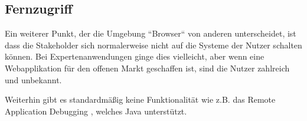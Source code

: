 \subsection{Fernzugriff}

Ein weiterer Punkt, der die Umgebung ``Browser`` von anderen unterscheidet, ist dass die Stakeholder sich normalerweise nicht auf die Systeme der Nutzer schalten können. Bei Expertenanwendungen ginge dies vielleicht, aber wenn eine Webapplikation für den offenen Markt geschaffen ist, sind die Nutzer zahlreich und unbekannt.

Weiterhin gibt es standardmäßig keine Funktionalität wie z.B. das Remote Application Debugging \cite{JavaDebugWireProtocol}, welches Java unterstützt.
